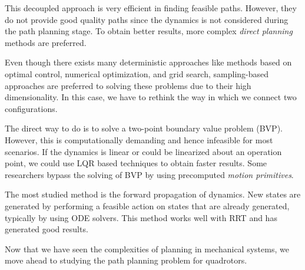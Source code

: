 This decoupled approach is very efficient in finding feasible paths. However, they do not provide good quality paths since the dynamics is not considered during the path planning stage. To obtain better results, more complex \textit{direct planning} methods are preferred. 

Even though there exists many deterministic approaches like methods based on optimal control, numerical optimization, and grid search, sampling-based approaches are preferred to solving these problems due to their high dimensionality. In this case, we have to rethink the way in which we connect two configurations. 

The direct way to do is to solve a two-point boundary value problem (BVP). However, this is computationally demanding and hence infeasible for most scenarios. If the dynamics is linear or could be linearized about an operation point, we could use LQR based techniques to obtain faster results. Some researchers bypass the solving of BVP by using precomputed \textit{motion primitives}.

The most studied method is the forward propagation of dynamics. New states are generated by performing a feasible action on states that are already generated, typically by using ODE solvers. This method works well with RRT and has generated good results. 

Now that we have seen the complexities of planning in mechanical systems, we move ahead to studying the path planning problem for quadrotors.













